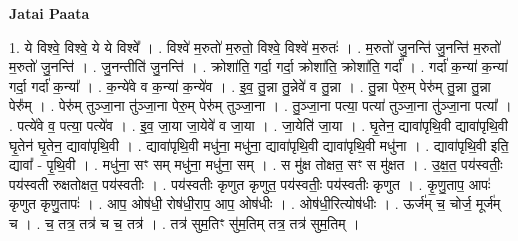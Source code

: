 \documentclass[17pt]{extarticle}
\begin{document}
\textbf{Jatai Paata} \newline

1. ये विश्वे॒ विश्वे॒ ये ये विश्वे᳚ । . विश्वे॑ म॒रुतो॑ म॒रुतो॒ विश्वे॒ विश्वे॑ म॒रुतः॑ । . म॒रुतो॑ जु॒नन्ति॑ जु॒नन्ति॑ म॒रुतो॑ म॒रुतो॑ जु॒नन्ति॑ । . जु॒नन्तीति॑ जु॒नन्ति॑ । . क्रोशा॑ति॒ गर्दा॒ गर्दा॒ क्रोशा॑ति॒ क्रोशा॑ति॒ गर्दा᳚ । . गर्दा॑ क॒न्या॑ क॒न्या॑ गर्दा॒ गर्दा॑ क॒न्या᳚ । . क॒न्ये॑वे व क॒न्या॑ क॒न्ये॑व । . इ॒व॒ तु॒न्ना तु॒न्नेवे॑ व तु॒न्ना । . तु॒न्ना पेरु॒म् पेरु॑म् तु॒न्ना तु॒न्ना पेरु᳚म् । . पेरु॑म् तुञ्जा॒ना तु॑ञ्जा॒ना पेरु॒म् पेरु॑म् तुञ्जा॒ना । . तु॒ञ्जा॒ना पत्या॒ पत्या॑ तुञ्जा॒ना तु॑ञ्जा॒ना पत्या᳚ । . पत्ये॑वे व॒ पत्या॒ पत्ये॑व । . इ॒व॒ जा॒या जा॒येवे॑ व जा॒या । . जा॒येति॑ जा॒या । . घृ॒तेन॒ द्यावा॑पृथि॒वी द्यावा॑पृथि॒वी घृ॒तेन॑ घृ॒तेन॒ द्यावा॑पृथि॒वी । . द्यावा॑पृथि॒वी मधु॑ना॒ मधु॑ना॒ द्यावा॑पृथि॒वी द्यावा॑पृथि॒वी मधु॑ना । . द्यावा॑पृथि॒वी इति॒ द्यावा᳚ - पृ॒थि॒वी । . मधु॑ना॒ सꣳ सम् मधु॑ना॒ मधु॑ना॒ सम् । . स मु॑क्ष तोक्षत॒ सꣳ स मु॑क्षत । . उ॒क्ष॒त॒ पय॑स्वतीः॒ पय॑स्वती रुक्षतोक्षत॒ पय॑स्वतीः । . पय॑स्वतीः कृणुत कृणुत॒ पय॑स्वतीः॒ पय॑स्वतीः कृणुत । . कृ॒णु॒ताप॒ आपः॑ कृणुत कृणु॒तापः॑ । . आप॒ ओष॑धी॒ रोष॑धी॒राप॒ आप॒ ओष॑धीः । . ओष॑धी॒रित्योष॑धीः । . ऊर्ज॑म् च॒ चोर्ज॒ मूर्ज॑म् च । . च॒ तत्र॒ तत्र॑ च च॒ तत्र॑ । . तत्र॑ सुम॒तिꣳ सु॑म॒तिम् तत्र॒ तत्र॑ सुम॒तिम् । \newline
\end{document}
